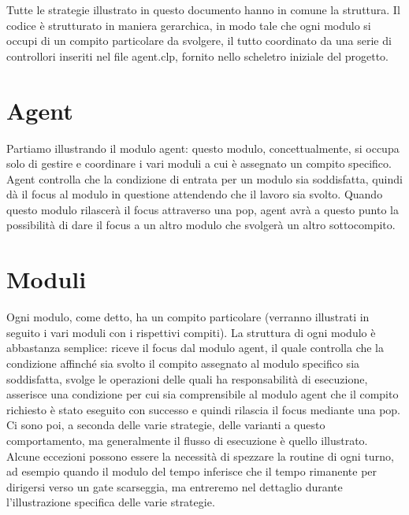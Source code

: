 Tutte le strategie illustrato in questo documento hanno in comune la struttura.
Il codice è strutturato in maniera gerarchica, in modo tale che ogni modulo si occupi di un compito particolare da svolgere, il tutto coordinato da una serie di controllori inseriti nel file agent.clp, fornito nello scheletro iniziale del progetto.
\section{Agent} \label{sec:agent}
Partiamo illustrando il modulo agent: questo modulo, concettualmente, si occupa solo di gestire e coordinare i vari moduli a cui è assegnato un compito specifico. Agent controlla che la condizione di entrata per un modulo sia soddisfatta, quindi dà il focus al modulo in questione attendendo che il lavoro sia svolto. Quando questo modulo rilascerà il focus attraverso una pop, agent avrà a questo punto la possibilità di dare il focus a un altro modulo che svolgerà un altro sottocompito.

\section{Moduli} \label{sec:moduli}
Ogni modulo, come detto, ha un compito particolare (verranno illustrati in seguito i vari moduli con i rispettivi compiti). La struttura di ogni modulo è abbastanza semplice: riceve il focus dal modulo agent, il quale controlla che la condizione affinché sia svolto il compito assegnato al modulo specifico sia soddisfatta, svolge le operazioni delle quali ha responsabilità di esecuzione, asserisce una condizione per cui sia comprensibile al modulo agent che il compito richiesto è stato eseguito con successo e quindi rilascia il focus mediante una pop.
Ci sono poi, a seconda delle varie strategie, delle varianti a questo comportamento, ma generalmente il flusso di esecuzione è quello illustrato. Alcune eccezioni possono essere la necessità di spezzare la routine di ogni turno, ad esempio quando il modulo del tempo inferisce che il tempo rimanente per dirigersi verso un gate scarseggia, ma entreremo nel dettaglio durante l'illustrazione specifica delle varie strategie.

